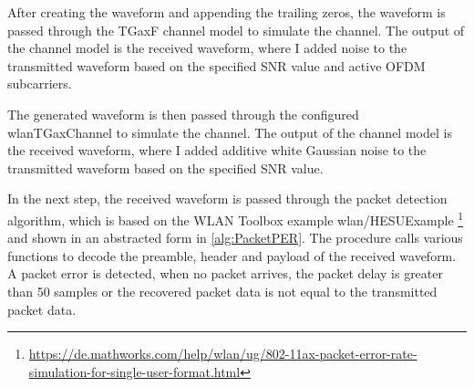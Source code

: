 After creating the waveform and appending the trailing zeros, the waveform is passed through the TGaxF channel model to simulate the channel.
The output of the channel model is the received waveform, where I added noise to the transmitted waveform based on the
specified \ac{SNR} value and active \ac{OFDM} subcarriers.

The generated waveform is then passed through the configured wlanTGaxChannel to simulate the channel.
The output of the channel model is the received waveform, where I added additive white Gaussian noise to the transmitted waveform based on the specified \ac{SNR} value.

In the next step, the received waveform is passed through the packet detection algorithm, which is based on the
WLAN Toolbox example wlan/HESUExample \footnote{\url{https://de.mathworks.com/help/wlan/ug/802-11ax-packet-error-rate-simulation-for-single-user-format.html}} and
shown in an abstracted form in \autoref{alg:PacketPER}.
The procedure calls various functions to decode the preamble, header and payload of
the received waveform.
A packet error is detected, when no packet arrives, the packet delay is greater than \num{50} samples or the recovered packet data
is not equal to the transmitted packet data.

